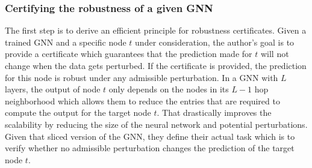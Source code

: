 \documentclass[a4paper,preprint]{sig-alternate}
\begin{document}
\subsubsection{Certifying the robustness of a given GNN}

The first step is to derive an efficient principle for robustness certificates. Given a trained GNN and a specific node $t$ under consideration,
the author's goal is to provide a certificate which guarantees that the prediction made for $t$ will not change when the data gets perturbed.
If the certificate is provided, the prediction for this node is robust under any admissible perturbation.
In a GNN with $L$ layers, the output of node $t$ only depends on the nodes in its $L-1$ hop neighborhood
which allows them to reduce the entries that are required to compute the output for the target node $t$. That drastically improves the scalability
by reducing the size of the neural network and potential perturbations. Given that sliced version of the GNN, they define their actual
task which is to verify whether no admissible perturbation changes the prediction of the target node $t$.\newline
\end{document}
